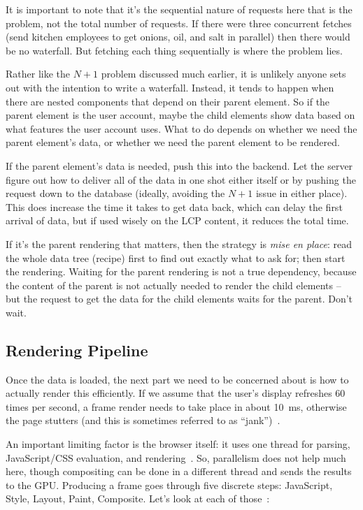 It is important to note that it's the sequential nature of requests here that is the problem, not the total number of requests. If there were three concurrent fetches (send kitchen employees to get onions, oil, and salt in parallel) then there would be no waterfall. But fetching each thing sequentially is where the problem lies.

Rather like the $N+1$ problem discussed much earlier, it is unlikely anyone sets out with the intention to write a waterfall. Instead, it tends to happen when there are nested components that depend on their parent element. So if the parent element is the user account, maybe the child elements show data based on what features the user account uses. What to do depends on whether we need the parent element's data, or whether we need the parent element to be rendered.

If the parent element's data is needed, push this into the backend. Let the server figure out how to deliver all of the data in one shot either itself or by pushing the request down to the database (ideally, avoiding the $N+1$ issue in either place). This does increase the time it takes to get data back, which can delay the first arrival of data, but if used wisely on the LCP content, it reduces the total time.

If it's the parent rendering that matters, then the strategy is \textit{mise en place}: read the whole data tree (recipe) first to find out exactly what to ask for; then start the rendering. Waiting for the parent rendering is not a true dependency, because the content of the parent is not actually needed to render the child elements -- but the request to get the data for the child elements waits for the parent. Don't wait.

\subsection*{Rendering Pipeline}
Once the data is loaded, the next part we need to be concerned about is how to actually render this efficiently. If we assume that the user's display refreshes 60 times per second, a frame render needs to take place in about 10~ms, otherwise the page stutters (and this is sometimes referred to as ``jank'')~\cite{renderingperf}.

An important limiting factor is the browser itself: it uses one thread for parsing, JavaScript/CSS evaluation, and rendering~\cite{wprof}. So, parallelism does not help much here, though compositing can be done in a different thread and sends the results to the GPU. Producing a frame goes through five discrete steps: JavaScript, Style, Layout, Paint, Composite. Let's look at each of those~\cite{renderingperf}:

